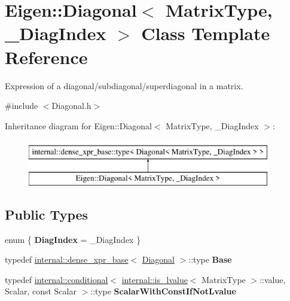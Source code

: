 \hypertarget{class_eigen_1_1_diagonal}{}\section{Eigen\+::Diagonal$<$ Matrix\+Type, \+\_\+\+Diag\+Index $>$ Class Template Reference}
\label{class_eigen_1_1_diagonal}


Expression of a diagonal/subdiagonal/superdiagonal in a matrix.  




{\ttfamily \#include $<$Diagonal.\+h$>$}

Inheritance diagram for Eigen\+::Diagonal$<$ Matrix\+Type, \+\_\+\+Diag\+Index $>$\+:\begin{figure}[H]
\begin{center}
\leavevmode
\includegraphics[height=2.000000cm]{class_eigen_1_1_diagonal}
\end{center}
\end{figure}
\subsection*{Public Types}
\begin{DoxyCompactItemize}
\item 
\mbox{\label{class_eigen_1_1_diagonal_a6071cc4d3396a1ae3c77fa5084c634d5}} 
enum \{ {\bfseries Diag\+Index} = \+\_\+\+Diag\+Index
 \}
\item 
\mbox{\label{class_eigen_1_1_diagonal_acbae030c9f3fd3fe70651086e590255d}} 
typedef \mbox{\hyperlink{struct_eigen_1_1internal_1_1dense__xpr__base}{internal\+::dense\+\_\+xpr\+\_\+base}}$<$ \mbox{\hyperlink{class_eigen_1_1_diagonal}{Diagonal}} $>$\+::type {\bfseries Base}
\item 
\mbox{\label{class_eigen_1_1_diagonal_a94d1a2a35eaf7a7e56c0e982f5bffc1c}} 
typedef \mbox{\hyperlink{struct_eigen_1_1internal_1_1conditional}{internal\+::conditional}}$<$ \mbox{\hyperlink{struct_eigen_1_1internal_1_1is__lvalue}{internal\+::is\+\_\+lvalue}}$<$ Matrix\+Type $>$\+::value, Scalar, const Scalar $>$\+::type {\bfseries Scalar\+With\+Const\+If\+Not\+Lvalue}
\end{DoxyCompactItemize}
